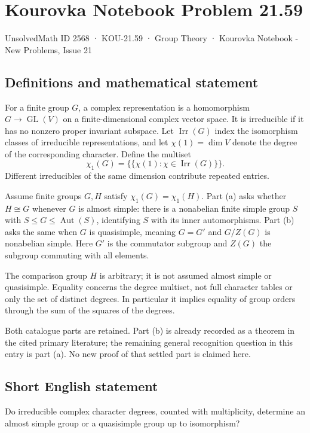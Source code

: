 \documentclass[11pt,a4paper]{article}
\begin{document}
\section*{Kourovka Notebook Problem 21.59}\label{2568}
{\small UnsolvedMath ID 2568 · KOU-21.59 · Group Theory · Kourovka Notebook - New Problems, Issue 21}
\subsection{Definitions and mathematical statement}
For a finite group $G$, a complex representation is a homomorphism
$G\to\operatorname{GL}(V)$ on a finite-dimensional complex vector space.
It is irreducible if it has no nonzero proper invariant subspace.
Let $\operatorname{Irr}(G)$ index the isomorphism classes of irreducible
representations, and let $\chi(1)=\dim V$ denote the degree of the
corresponding character. Define the multiset
\[
 \chi_1(G)=\{\!\{\chi(1):\chi\in\operatorname{Irr}(G)\}\!\}.
\]
Different irreducibles of the same dimension contribute repeated entries.

Assume finite groups $G,H$ satisfy $\chi_1(G)=\chi_1(H)$.
Part (a) asks whether $H\cong G$ whenever $G$ is almost simple: there
is a nonabelian finite simple group $S$ with
$S\le G\le\operatorname{Aut}(S)$, identifying $S$ with its inner
automorphisms. Part (b) asks the same when $G$ is quasisimple, meaning
$G=G'$ and $G/Z(G)$ is nonabelian simple. Here $G'$ is the commutator
subgroup and $Z(G)$ the subgroup commuting with all elements.

The comparison group $H$ is arbitrary; it is not assumed almost simple
or quasisimple. Equality concerns the degree multiset, not full character
tables or only the set of distinct degrees. In particular it implies
equality of group orders through the sum of the squares of the degrees.

Both catalogue parts are retained. Part (b) is already recorded as a
theorem in the cited primary literature; the remaining general recognition
question in this entry is part (a). No new proof of that settled part
is claimed here.
\subsection{Short English statement}
Do irreducible complex character degrees, counted with multiplicity, determine an almost simple group or a quasisimple group up to isomorphism?
\end{document}
